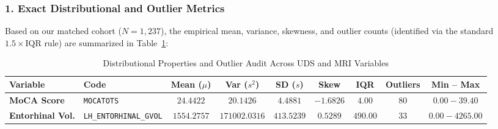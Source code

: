 \documentclass[11pt, a4paper]{article}
\begin{document}
\subsubsection*{1. Exact Distributional and Outlier Metrics}
Based on our matched cohort ($N = 1,237$), the empirical mean, variance, skewness, and outlier counts (identified via the standard $1.5 \times \text{IQR}$ rule) are summarized in Table~\ref{tab:pathc_c2}:

\begin{table}[H]
\centering
\caption{Distributional Properties and Outlier Audit Across UDS and MRI Variables}
\label{tab:pathc_c2}
\begin{adjustbox}{max width=\textwidth}
\small
\setlength{\tabcolsep}{4pt}
\begin{tabular}{llccccccc}
\toprule
\textbf{Variable} & \textbf{Code} & \textbf{Mean ($\mu$)} & \textbf{Var ($s^2$)} & \textbf{SD ($s$)} & \textbf{Skew} & \textbf{IQR} & \textbf{Outliers} & \textbf{Min -- Max} \\
\midrule
\textbf{MoCA Score} & \texttt{MOCATOTS} & $24.4422$ & $20.1426$ & $4.4881$ & $-1.6826$ & $4.00$ & $80$ & $0.00 - 39.40$ \\
\textbf{Entorhinal Vol.} & \texttt{LH\_ENTORHINAL\_GVOL} & $1554.2757$ & $171002.0316$ & $413.5239$ & $0.5289$ & $490.00$ & $33$ & $0.00 - 4265.00$ \\
\bottomrule
\end{tabular}
\end{adjustbox}
\end{table}
\end{document}
